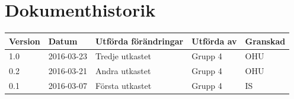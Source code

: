 \documentclass[11pt]{article}
\begin{document}
\tableofcontents

\pagebreak

\section*{Dokumenthistorik}
\begin{table}[h]
\begin{tabular}{|l|l|l|l|l|} \hline

\textbf{Version} & \textbf{Datum} & \textbf{Utförda förändringar} & \textbf{Utförda av} & \textbf{Granskad} \\ \hline
1.0 & 2016-03-23 & Tredje utkastet & Grupp 4 & OHU \\ \hline
0.2 & 2016-03-21 & Andra utkastet & Grupp 4 & OHU \\ \hline
0.1 & 2016-03-07 &  Första utkastet & Grupp 4 & IS \\ \hline
\end{tabular}
\end{table}

\pagebreak
{}
\end{document}
